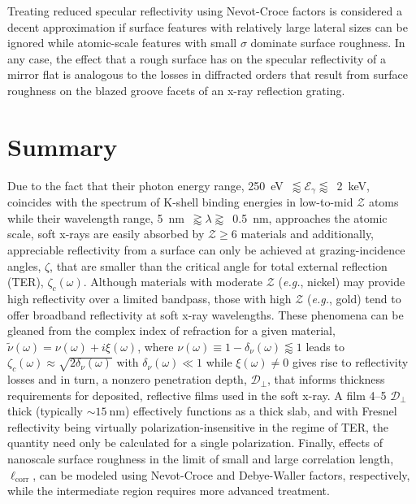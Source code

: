 Treating reduced specular reflectivity using Nevot-Croce factors is considered a decent approximation if surface features with relatively large lateral sizes can be ignored while atomic-scale features with small $\sigma$ dominate surface roughness. 
In any case, the effect that a rough surface has on the specular reflectivity of a mirror flat is analogous to the losses in diffracted orders that result from surface roughness on the blazed groove facets of an x-ray reflection grating. %

\section{Summary}\label{sec:appC_summary}
Due to the fact that their photon energy range, \SI{250}{\electronvolt}~$\lessapprox \mathcal{E}_{\gamma} \lessapprox$~\SI{2}{\kilo\electronvolt}, coincides with the spectrum of K-shell binding energies in low-to-mid $\mathcal{Z}$ atoms while their wavelength range, \SI{5}{\nm}~$\gtrapprox \lambda \gtrapprox$~\SI{0.5}{\nm}, approaches the atomic scale, soft x-rays are easily absorbed by $\mathcal{Z} \geq 6$ materials and additionally, appreciable reflectivity from a surface can only be achieved at grazing-incidence angles, $\zeta$, that are smaller than the critical angle for total external reflection (TER), $\zeta_c (\omega)$. 
Although materials with moderate $\mathcal{Z}$ (\emph{e.g.}, nickel) may provide high reflectivity over a limited bandpass, those with high $\mathcal{Z}$ (\emph{e.g.}, gold) tend to offer broadband reflectivity at soft x-ray wavelengths. 
These phenomena can be gleaned from the complex index of refraction for a given material, $\tilde{\nu} (\omega) = \nu (\omega) + i \xi (\omega)$, 
where $\nu (\omega) \equiv 1 - \delta_{\nu} (\omega) \lessapprox 1$ leads to $\zeta_c (\omega) \approx \sqrt{2 \delta_{\nu} (\omega)}$ with $\delta_{\nu} (\omega) \ll 1$ while $\xi (\omega) \neq 0$ gives rise to reflectivity losses and in turn, a nonzero penetration depth, $\mathcal{D}_{\perp}$, that informs thickness requirements for deposited, reflective films used in the soft x-ray. 
A film \numrange{4}{5} $\mathcal{D}_{\perp}$ thick (typically $\sim \SI{15}{\nm}$) effectively functions as a thick slab, and with Fresnel reflectivity being virtually polarization-insensitive in the regime of TER, the quantity need only be calculated for a single polarization. 
Finally, effects of nanoscale surface roughness in the limit of small and large correlation length, $\ell_{\text{corr}}$, can be modeled using Nevot-Croce and Debye-Waller factors, respectively, while the intermediate region requires more advanced treatment. 
